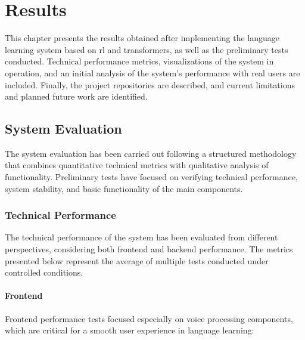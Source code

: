 \chapter{Results}
\label{chap:resultados}

This chapter presents the results obtained after implementing the language learning system based on \gls{rl} and \gls{transformers}, as well as the preliminary tests conducted. Technical performance metrics, visualizations of the system in operation, and an initial analysis of the system's performance with real users are included. Finally, the project repositories are described, and current limitations and planned future work are identified.

\section{System Evaluation}
\label{sec:evaluacion-sistema}

The system evaluation has been carried out following a structured methodology that combines quantitative technical metrics with qualitative analysis of functionality. Preliminary tests have focused on verifying technical performance, system stability, and basic functionality of the main components.

\subsection{Technical Performance}
\label{subsec:rendimiento-tecnico}

The technical performance of the system has been evaluated from different perspectives, considering both frontend and backend performance. The metrics presented below represent the average of multiple tests conducted under controlled conditions.

\subsubsection{Frontend}
\label{subsubsec:frontend-rendimiento}

Frontend performance tests focused especially on voice processing components, which are critical for a smooth user experience in language learning:

